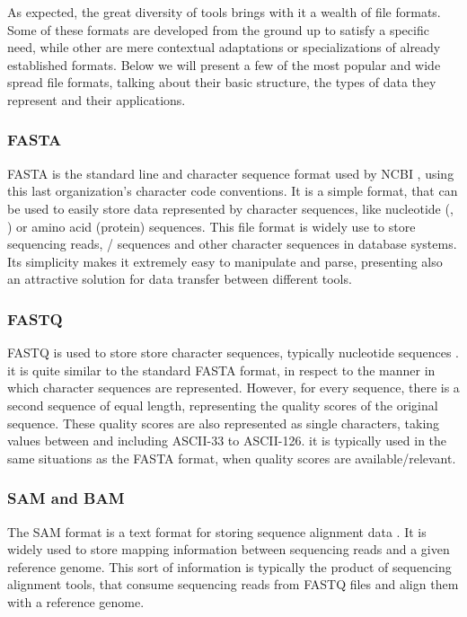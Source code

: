 As expected, the great diversity of \rnaseq{} tools brings with it a wealth of
file formats. Some of these formats are developed from the ground up to satisfy
a specific need, while other are mere contextual adaptations or specializations
of already established formats. Below we will present a few of the most popular
and wide spread file formats, talking about their basic structure, the types of
data they represent and their applications.

\subsubsection*{FASTA}

FASTA is the standard line and character sequence format used by NCBI
\cite{ncbi:fasta}, using this last organization's character code conventions. It
is a simple format, that can be used to easily store data represented by
character sequences, like nucleotide (\dna, \rna) or amino acid (protein)
sequences. This file format is widely use to store sequencing reads, \dna/\rna{}
sequences and other character sequences in database systems. Its simplicity
makes it extremely easy to manipulate and parse, presenting also an attractive
solution for data transfer between different tools.

\subsubsection*{FASTQ}

FASTQ is used to store store character sequences, typically nucleotide sequences
\cite{Cock2010}. it is quite similar to the standard FASTA format, in respect to
the manner in which character sequences are represented. However, for every
sequence, there is a second sequence of equal length, representing the quality
scores of the original sequence. These quality scores are also represented as
single characters, taking values between and including ASCII-33 to ASCII-126.
it is typically used in the same situations as the FASTA format, when quality
scores are available/relevant.

\subsubsection*{SAM and BAM}

The SAM format is a text format for storing sequence alignment data
\cite{genome:sam}. It is widely used to store mapping information between
sequencing reads and a given reference genome. This sort of information is
typically the product of sequencing alignment tools, that consume sequencing
reads from FASTQ files and align them with a reference genome.

